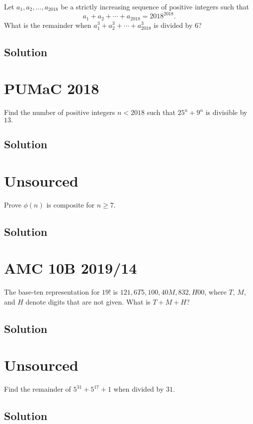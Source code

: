 \documentclass[mast]{lucky}
\begin{document}
Let $a_1,a_2,\dots,a_{2018}$ be a strictly increasing sequence of positive integers such that\[a_1+a_2+\cdots+a_{2018}=2018^{2018}.\]What is the remainder when $a_1^3+a_2^3+\cdots+a_{2018}^3$ is divided by $6$?

\subsection{Solution}

\pagebreak\section{PUMaC 2018}

Find the number of positive integers $n<2018$ such that $25^n+9^n$ is divisible by $13.$

\subsection{Solution}

\pagebreak\section{Unsourced}

Prove $\phi(n)$ is composite for $n\geq 7.$

\subsection{Solution}

\pagebreak\section{AMC 10B 2019/14}

The base-ten representation for $19!$ is $121,6T5,100,40M,832,H00$, where $T$, $M$, and $H$ denote digits that are not given. What is $T+M+H$?

\subsection{Solution}

\pagebreak\section{Unsourced}

Find the remainder of $5^{31}+5^{17}+1$ when divided by $31.$

\subsection{Solution}
\end{document}
